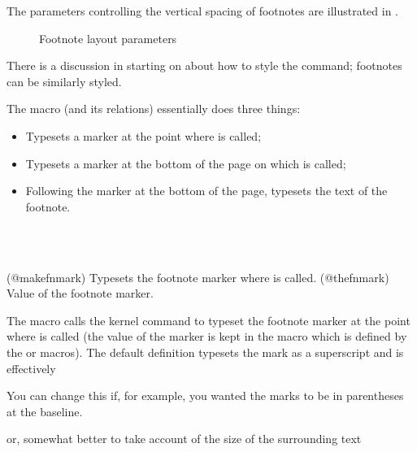      The parameters controlling the vertical spacing of footnotes are 
 illustrated in .

 \begin{figure}
 \centering
 \drawparameterstrue
 \drawfootnote
 \caption{Footnote layout parameters}\label{fig:fn}
 \end{figure}

     There is a discussion in  starting on
 about how to style the \cmd{\thanks} command; footnotes
can be similarly styled. 

    The \cmd{\footnote} macro (and its relations) essentially does three 
things:
\begin{itemize}
\item Typesets a marker at the point where 
      \cmd{\footnote} is called;
\item Typesets a marker at the bottom of the page 
      on which \cmd{\footnote} is called;
\item Following the marker at the bottom of the page, typesets the 
      text  of the footnote.
\end{itemize}

\begin{syntax}
\cmd{\@makefnmark} \\
\cmd{\@thefnmark} \\
\end{syntax}
\glossary(@makefnmark)%
  {}%
  {Typesets the footnote marker where  is called.}
\glossary(@thefnmark)%
  {}%
  {Value of the footnote marker.}

The \cmd{\footnote} macro calls the kernel command \cmd{\@makefnmark} to
typeset the footnote marker at the point where \cmd{\footnote} is called
(the value of the marker is kept in the macro \cmd{\@thefnmark}
which is defined by the \cmd{\footnote} or \cmd{\footnotemark} macros). 
The default definition typesets the mark 
as a superscript and is effectively
\begin{lcode}
\newcommand*{\@makefnmark}{\hbox{\textsuperscript{\@thefnmark}}}
\end{lcode}
You can change this if, for example,
 you wanted the marks to be in parentheses at the baseline.
 \begin{lcode}
 \renewcommand*{\@makefnmark}{{\footnotesize (\@thefnmark)}}
 \end{lcode}
 or, somewhat better to take account of the size of the surrounding text
 \begin{lcode}
 \renewcommand*{\@makefnmark}{\slashfracstyle{(\@thefnmark)}}
 \end{lcode}



